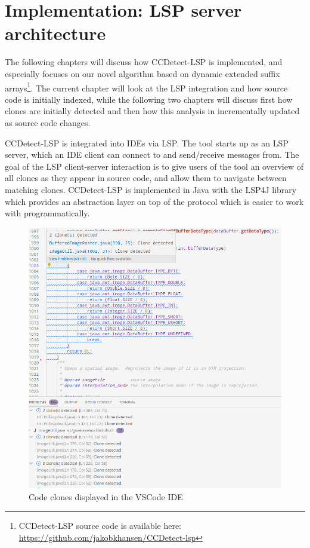 \chapter{Implementation: LSP server architecture}
\label{lspimplementation}

The following chapters will discuss how CCDetect-LSP is implemented, and especially
focuses on our novel algorithm based on dynamic extended suffix
arrays\footnote{CCDetect-LSP source code is available here:
\url{https://github.com/jakobkhansen/CCDetect-lsp}}. The current chapter will look at the
LSP integration and how source code is initially indexed, while the following two chapters
will discuss first how clones are initially detected and then how this analysis in
incrementally updated as source code changes.

CCDetect-LSP is integrated into IDEs via LSP. The tool starts up as an LSP server, which
an IDE client can connect to and send/receive messages from. The goal of the LSP
client-server interaction is to give users of the tool an overview of all clones as they
appear in source code, and allow them to navigate between matching clones. CCDetect-LSP is
implemented in Java with the LSP4J library which provides an abstraction layer on top of
the protocol which is easier to work with programmatically.

\begin{figure}[ht!]
	\includegraphics[width=\textwidth]{figures/vscodecodeclone.png}
	\caption{Code clones displayed in the VSCode IDE}
	\label{fig:vscodeclones}
\end{figure}


